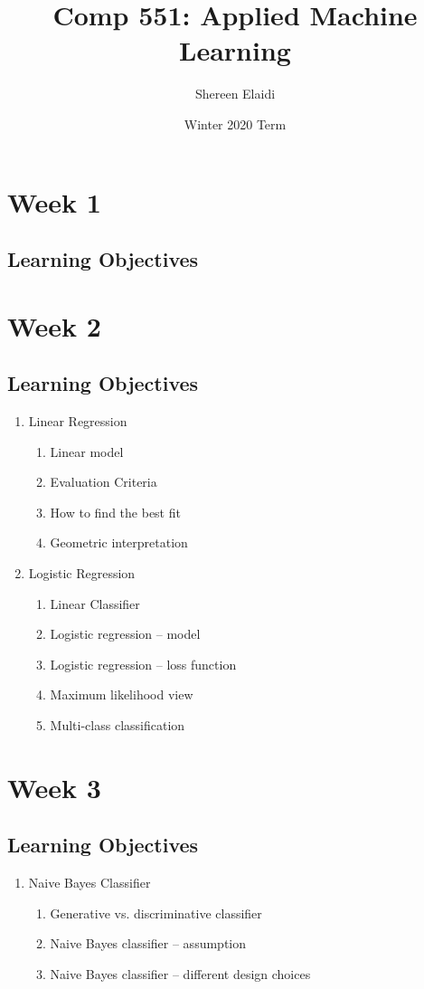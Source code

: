 \documentclass[11pt]{scrartcl}
\title{\textbf{Comp 551: Applied Machine Learning}}
\author{Shereen Elaidi}
\date{Winter 2020 Term}
\theoremstyle{definition}
\theoremstyle{remark}
\begin{document}
\maketitle
\tableofcontents

\section{Week 1}
\subsection{Learning Objectives}
\section{Week 2}
\subsection{Learning Objectives}
\begin{enumerate}[noitemsep]
	\item Linear Regression
	\begin{enumerate}[noitemsep]
		\item Linear model 
		\item Evaluation Criteria 
		\item How to find the best fit 
		\item Geometric interpretation 
	\end{enumerate}
	\item Logistic Regression
	\begin{enumerate}[noitemsep]
		\item Linear Classifier 
		\item Logistic regression -- model 
		\item Logistic regression -- loss function
		\item Maximum likelihood view 
		\item Multi-class classification
	\end{enumerate}
\end{enumerate}


\section{Week 3}

\subsection{Learning Objectives}
\begin{enumerate}
	\item Naive Bayes Classifier 
	\begin{enumerate}[noitemsep]
		\item Generative vs. discriminative classifier 
		\item Naive Bayes classifier -- assumption 
		\item Naive Bayes classifier -- different design choices
	\end{enumerate}
\end{enumerate}
\end{document}

